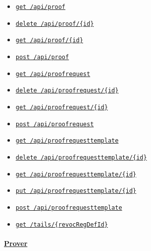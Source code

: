\begin{itemize}
\tightlist
\item
  \protect\hyperlink{apiProofGet}{\texttt{get\ /api/proof}}
\item
  \protect\hyperlink{apiProofIdDelete}{\texttt{delete\ /api/proof/\{id\}}}
\item
  \protect\hyperlink{apiProofIdGet}{\texttt{get\ /api/proof/\{id\}}}
\item
  \protect\hyperlink{apiProofPost}{\texttt{post\ /api/proof}}
\item
  \protect\hyperlink{apiProofrequestGet}{\texttt{get\ /api/proofrequest}}
\item
  \protect\hyperlink{apiProofrequestIdDelete}{\texttt{delete\ /api/proofrequest/\{id\}}}
\item
  \protect\hyperlink{apiProofrequestIdGet}{\texttt{get\ /api/proofrequest/\{id\}}}
\item
  \protect\hyperlink{apiProofrequestPost}{\texttt{post\ /api/proofrequest}}
\item
  \protect\hyperlink{apiProofrequesttemplateGet}{\texttt{get\ /api/proofrequesttemplate}}
\item
  \protect\hyperlink{apiProofrequesttemplateIdDelete}{\texttt{delete\ /api/proofrequesttemplate/\{id\}}}
\item
  \protect\hyperlink{apiProofrequesttemplateIdGet}{\texttt{get\ /api/proofrequesttemplate/\{id\}}}
\item
  \protect\hyperlink{apiProofrequesttemplateIdPut}{\texttt{put\ /api/proofrequesttemplate/\{id\}}}
\item
  \protect\hyperlink{apiProofrequesttemplatePost}{\texttt{post\ /api/proofrequesttemplate}}
\item
  \protect\hyperlink{tailsRevocRegDefIdGet}{\texttt{get\ /tails/\{revocRegDefId\}}}
\end{itemize}

\hypertarget{prover}{%
\paragraph{\texorpdfstring{\protect\hyperlink{Prover}{Prover}}{Prover}}\label{prover}}

